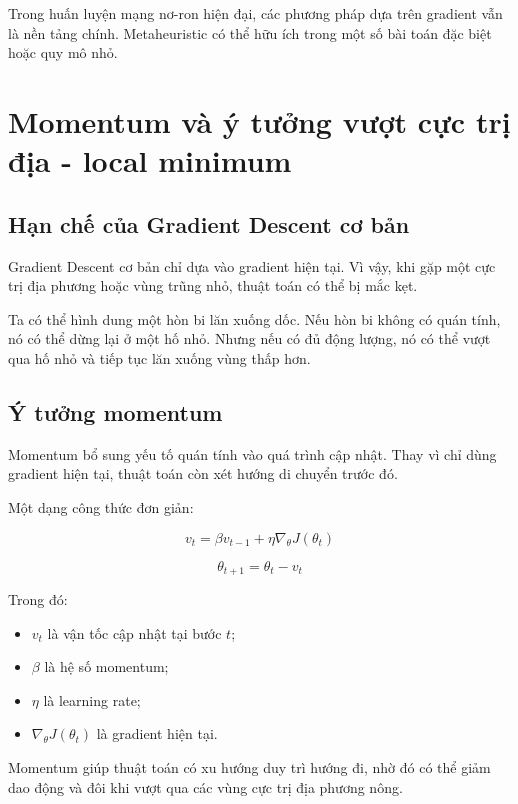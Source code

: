 \documentclass[12pt,a4paper]{report}
\begin{document}
\begin{luuy}
Trong huấn luyện mạng nơ-ron hiện đại, các phương pháp dựa trên gradient vẫn là nền tảng chính. Metaheuristic có thể hữu ích trong một số bài toán đặc biệt hoặc quy mô nhỏ.
\end{luuy}

\chapter{Momentum và ý tưởng vượt cực trị địa  - local minimum}

\section{Hạn chế của Gradient Descent cơ bản}

Gradient Descent cơ bản chỉ dựa vào gradient hiện tại. Vì vậy, khi gặp một cực trị địa phương hoặc vùng trũng nhỏ, thuật toán có thể bị mắc kẹt.

Ta có thể hình dung một hòn bi lăn xuống dốc. Nếu hòn bi không có quán tính, nó có thể dừng lại ở một hố nhỏ. Nhưng nếu có đủ động lượng, nó có thể vượt qua hố nhỏ và tiếp tục lăn xuống vùng thấp hơn.

\section{Ý tưởng momentum}

Momentum bổ sung yếu tố quán tính vào quá trình cập nhật. Thay vì chỉ dùng gradient hiện tại, thuật toán còn xét hướng di chuyển trước đó.

Một dạng công thức đơn giản:

\[
    v_t = \beta v_{t-1} + \eta \nabla_{\theta}J(\theta_t)
\]

\[
    \theta_{t+1} = \theta_t - v_t
\]

Trong đó:

\begin{itemize}
    \item $v_t$ là vận tốc cập nhật tại bước $t$;
    \item $\beta$ là hệ số momentum;
    \item $\eta$ là learning rate;
    \item $\nabla_{\theta}J(\theta_t)$ là gradient hiện tại.
\end{itemize}

\begin{ghinho}
Momentum giúp thuật toán có xu hướng duy trì hướng đi, nhờ đó có thể giảm dao động và đôi khi vượt qua các vùng cực trị địa phương nông.
\end{ghinho}
\end{document}
